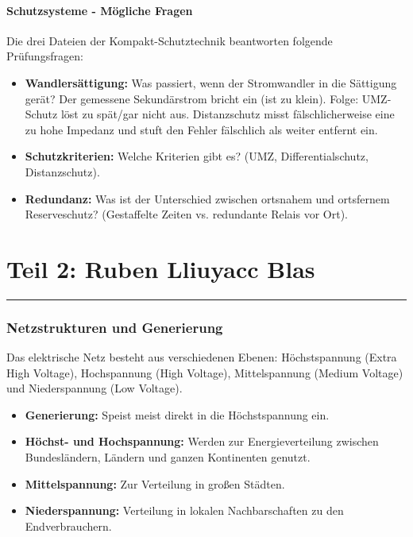 \documentclass[11pt, a4paper]{article}
\begin{document}
\subsection{Schutzsysteme - Mögliche Fragen}
Die drei Dateien der Kompakt-Schutztechnik beantworten folgende Prüfungsfragen:
\begin{itemize}
    \item \textbf{Wandlersättigung:} Was passiert, wenn der Stromwandler in die Sättigung gerät? Der gemessene Sekundärstrom bricht ein (ist zu klein). Folge: UMZ-Schutz löst zu spät/gar nicht aus. Distanzschutz misst fälschlicherweise eine zu hohe Impedanz und stuft den Fehler fälschlich als weiter entfernt ein.
    \item \textbf{Schutzkriterien:} Welche Kriterien gibt es? (UMZ, Differentialschutz, Distanzschutz).
    \item \textbf{Redundanz:} Was ist der Unterschied zwischen ortsnahem und ortsfernem Reserveschutz? (Gestaffelte Zeiten vs. redundante Relais vor Ort).
\end{itemize}

\part*{Teil 2: Ruben Lliuyacc Blas}
\hrule
\vspace{1cm}

\section{Netzstrukturen und Generierung}
Das elektrische Netz besteht aus verschiedenen Ebenen: Höchstspannung (Extra High Voltage), Hochspannung (High Voltage), Mittelspannung (Medium Voltage) und Niederspannung (Low Voltage).
\begin{itemize}
    \item \textbf{Generierung:} Speist meist direkt in die Höchstspannung ein.
    \item \textbf{Höchst- und Hochspannung:} Werden zur Energieverteilung zwischen Bundesländern, Ländern und ganzen Kontinenten genutzt.
    \item \textbf{Mittelspannung:} Zur Verteilung in großen Städten.
    \item \textbf{Niederspannung:} Verteilung in lokalen Nachbarschaften zu den Endverbrauchern.
\end{itemize}
\end{document}
